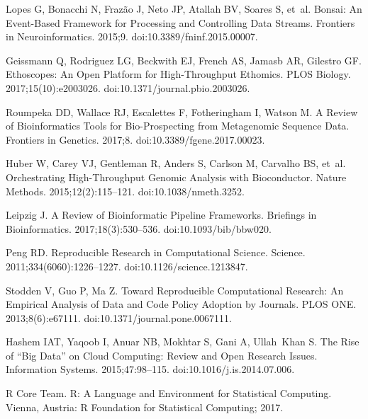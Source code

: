 \documentclass[10pt,letterpaper]{article}\usepackage[]{graphicx}\usepackage[]{color}
\begin{document}
\begin{thebibliography}{10}
	Lopes G, Bonacchi N, Fraz{\~a}o J, Neto JP, Atallah BV, Soares S, et~al.
	\newblock Bonsai: An Event-Based Framework for Processing and Controlling Data
	Streams.
	\newblock Frontiers in Neuroinformatics. 2015;9.
	\newblock doi:{10.3389/fninf.2015.00007}.
	
	Geissmann Q, Rodriguez LG, Beckwith EJ, French AS, Jamasb AR, Gilestro GF.
	\newblock Ethoscopes: {{An}} Open Platform for High-Throughput Ethomics.
	\newblock PLOS Biology. 2017;15(10):e2003026.
	\newblock doi:{10.1371/journal.pbio.2003026}.
	
	Roumpeka DD, Wallace RJ, Escalettes F, Fotheringham I, Watson M.
	\newblock A {{Review}} of {{Bioinformatics Tools}} for {{Bio}}-{{Prospecting}}
	from {{Metagenomic Sequence Data}}.
	\newblock Frontiers in Genetics. 2017;8.
	\newblock doi:{10.3389/fgene.2017.00023}.
	
	Huber W, Carey VJ, Gentleman R, Anders S, Carlson M, Carvalho BS, et~al.
	\newblock Orchestrating High-Throughput Genomic Analysis with {{Bioconductor}}.
	\newblock Nature Methods. 2015;12(2):115--121.
	\newblock doi:{10.1038/nmeth.3252}.
	
	Leipzig J.
	\newblock A Review of Bioinformatic Pipeline Frameworks.
	\newblock Briefings in Bioinformatics. 2017;18(3):530--536.
	\newblock doi:{10.1093/bib/bbw020}.
	
	Peng RD.
	\newblock Reproducible {{Research}} in {{Computational Science}}.
	\newblock Science. 2011;334(6060):1226--1227.
	\newblock doi:{10.1126/science.1213847}.
	
	Stodden V, Guo P, Ma Z.
	\newblock Toward {{Reproducible Computational Research}}: {{An Empirical
			Analysis}} of {{Data}} and {{Code Policy Adoption}} by {{Journals}}.
	\newblock PLOS ONE. 2013;8(6):e67111.
	\newblock doi:{10.1371/journal.pone.0067111}.
	
	Hashem IAT, Yaqoob I, Anuar NB, Mokhtar S, Gani A, Ullah~Khan S.
	\newblock The Rise of ``Big Data'' on Cloud Computing: {{Review}} and Open
	Research Issues.
	\newblock Information Systems. 2015;47:98--115.
	\newblock doi:{10.1016/j.is.2014.07.006}.
	
	{R Core Team}.
	\newblock R: {{A Language}} and {{Environment}} for {{Statistical Computing}}.
	\newblock Vienna, Austria: {R Foundation for Statistical Computing}; 2017.
	

\end{thebibliography}
\end{document}
